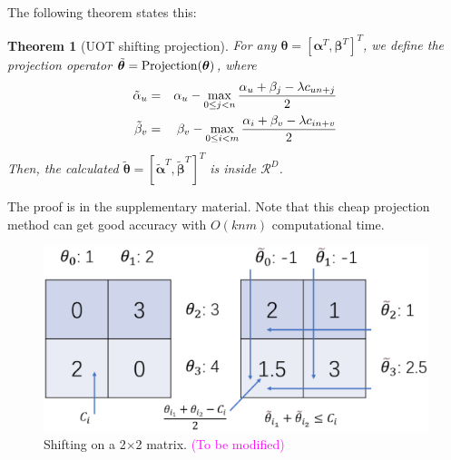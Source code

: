 \documentclass[twoside]{article}
\theoremstyle{plain}
\newtheorem{thm}{Theorem}
\renewcommand{\vec}[1]{\bm{#1}}
\newcommand{\changeXS}[1]{\textcolor{blue}{#1}}
\newcommand{\note}[1]{\textcolor{magenta}{#1}}
\begin{document}
The following theorem states this:
\begin{thm}[UOT shifting projection]
\label{Thm:UOT_ShiftProjection}
For any $\vec{\theta} = [{\vec{\alpha}}^T,{\vec{\beta}}^T]^T$, we define the projection operator $\tilde{\vec{\theta}}={\rm Projection}(\vec{\theta})$, where 
\changeXS{
\begin{eqnarray}
\tilde{{\alpha}}_u &=& {{\alpha}}_u - \max_{0\leq j < n} \frac{{{\alpha}}_u +{{\beta}}_j - \lambda{c}_{un+j}}{2} \notag\\
\tilde{{\beta}}_v &=& {{\beta}}_v - \max_{0 \leq i < m} \frac{{{\alpha}}_i +{{\beta}}_v - \lambda{c}_{in+v}}{2}\\
\label{eq:uotproj}
\end{eqnarray}
}
Then, the calculated $\tilde{\vec{\theta}} = [\tilde{\vec{\alpha}}^T,\tilde{\vec{\beta}}^T]^T$ is inside $\mathcal{R}^{D}$.
\end{thm}
The proof is in the supplementary material. Note that this cheap projection method can get good accuracy with $O(knm)$ computational time. 

\begin{figure}[h]
\begin{center}
\includegraphics[width = \linewidth]{pic/shifting}
\caption{Shifting on a 2$\times$2 matrix. \note{(To be modified)}}
\end{center}
\end{figure}
\end{document}
